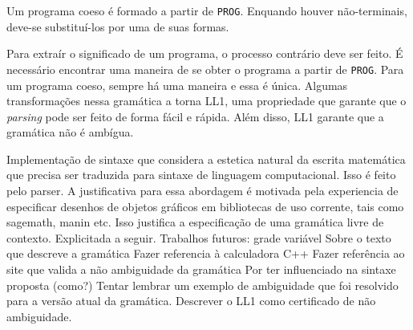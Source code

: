 Um programa coeso é formado a partir de \texttt{PROG}.
Enquando houver não-terminais, deve-se substituí-los por uma de suas formas.

Para extraír o significado de um programa, o processo contrário deve ser feito. 
É necessário encontrar uma maneira de se obter o programa a partir de \texttt{PROG}.
Para um programa coeso, sempre há uma maneira e essa é única.
Algumas transformações nessa gramática a torna LL1,
uma propriedade que garante que o \textit{parsing} pode ser feito de forma fácil e rápida.
Além disso, LL1 garante que a gramática não é ambígua. \cite{GramCheck}


Implementação de sintaxe que considera a estetica natural da escrita matemática que precisa ser traduzida para sintaxe de linguagem computacional. Isso é feito pelo parser.
A justificativa para essa abordagem é motivada pela experiencia de especificar desenhos de objetos gráficos em bibliotecas de uso corrente, tais como sagemath, manin etc.
Isso justifica a especificação de uma gramática livre de contexto. Explicitada a seguir.
Trabalhos futuros: grade variável
Sobre o texto que descreve a gramática
Fazer referencia à calculadora C++
Fazer referência ao site que valida a não ambiguidade da gramática
Por ter influenciado na sintaxe proposta (como?)
Tentar lembrar um exemplo de ambiguidade que foi resolvido para a versão atual da gramática.
Descrever o LL1 como certificado de não ambiguidade.